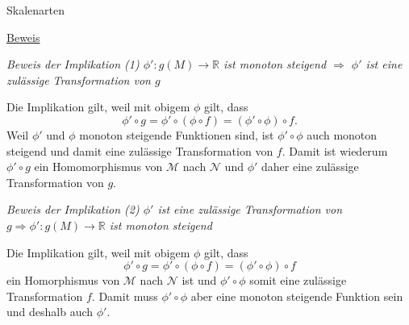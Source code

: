 \documentclass[
  8pt,
  ignorenonframetext,
]{beamer}
\begin{document}
\begin{frame}{Skalenarten}
\protect\hypertarget{skalenarten-5}{}
\footnotesize

\underline{Beweis}

\emph{Beweis der Implikation (1) \(\phi' : g(M) \to \mathbb{R}\) ist
monoton steigend \(\Rightarrow\) \(\phi'\) ist eine zulässige
Transformation von \(g\)}

Die Implikation gilt, weil mit obigem \(\phi\) gilt, dass
\begin{equation}
\phi' \circ g = \phi' \circ (\phi \circ f) = (\phi' \circ \phi) \circ f.
\end{equation} Weil \(\phi'\) und \(\phi\) monoton steigende Funktionen
sind, ist \(\phi' \circ \phi\) auch monoton steigend und damit eine
zulässige Transformation von \(f\). Damit ist wiederum \(\phi'\circ g\)
ein Homomorphismus von \(\mathcal{M}\) nach \(\mathcal{N}\) und
\(\phi'\) daher eine zulässige Transformation von \(g\). \vspace{1mm}

\emph{Beweis der Implikation (2) \(\phi'\) ist eine zulässige
Transformation von \(g \Rightarrow \phi' : g(M) \to \mathbb{R}\) ist
monoton steigend}

Die Implikation gilt, weil mit obigem \(\phi\) gilt, dass
\begin{equation}
\phi' \circ g = \phi' \circ (\phi \circ f) = (\phi' \circ \phi) \circ f
\end{equation} ein Homorphismus von \(\mathcal{M}\) nach \(\mathcal{N}\)
ist und \(\phi' \circ \phi\) somit eine zulässige Transformation \(f\).
Damit muss \(\phi' \circ \phi\) aber eine monoton steigende Funktion
sein und deshalb auch \(\phi'\).
\end{frame}
\end{document}
